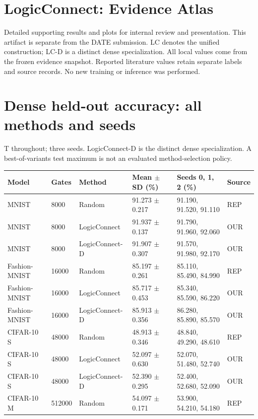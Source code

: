 \documentclass[10pt,a4paper]{article}
\begin{document}
\section*{LogicConnect: Evidence Atlas}
Detailed supporting results and plots for internal review and presentation. This artifact is separate from the DATE submission. LC denotes the unified construction; LC-D is a distinct dense specialization. All local values come from the frozen evidence snapshot. Reported literature values retain separate labels and source records. No new training or inference was performed.
\clearpage
\section*{Dense held-out accuracy: all methods and seeds}
T throughout; three seeds. LogicConnect-D is the distinct dense specialization. A best-of-variants test maximum is not an evaluated method-selection policy.
\par\bigskip
\setlength{\tabcolsep}{2pt}
\begin{tabular}{@{}p{57mm}p{37.0mm}p{37.0mm}p{37.0mm}p{37.0mm}p{37.0mm}@{}}
\toprule
Model & Gates & Method & Mean $\pm$ SD (\%) & Seeds 0, 1, 2 (\%) & Source \\ \midrule
MNIST & 8000 & Random & 91.273 $\pm$ 0.217 & 91.190, 91.520, 91.110 & REP \\
MNIST & 8000 & LogicConnect & 91.937 $\pm$ 0.137 & 91.790, 91.960, 92.060 & OUR \\
MNIST & 8000 & LogicConnect-D & 91.907 $\pm$ 0.307 & 91.570, 91.980, 92.170 & OUR \\
Fashion-MNIST & 16000 & Random & 85.197 $\pm$ 0.261 & 85.110, 85.490, 84.990 & REP \\
Fashion-MNIST & 16000 & LogicConnect & 85.717 $\pm$ 0.453 & 85.340, 85.590, 86.220 & OUR \\
Fashion-MNIST & 16000 & LogicConnect-D & 85.913 $\pm$ 0.356 & 86.280, 85.890, 85.570 & OUR \\
CIFAR-10 S & 48000 & Random & 48.913 $\pm$ 0.346 & 48.840, 49.290, 48.610 & REP \\
CIFAR-10 S & 48000 & LogicConnect & 52.097 $\pm$ 0.630 & 52.070, 51.480, 52.740 & OUR \\
CIFAR-10 S & 48000 & LogicConnect-D & 52.390 $\pm$ 0.295 & 52.400, 52.680, 52.090 & OUR \\
CIFAR-10 M & 512000 & Random & 54.097 $\pm$ 0.171 & 53.900, 54.210, 54.180 & REP \\
\bottomrule
\end{tabular}
\clearpage
\end{document}
